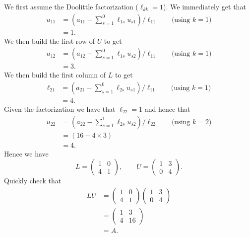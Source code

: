 \documentclass[10pt]{article}
\begin{document}
\begin{enumerate}
  We first assume the Doolittle factorization ($\ell_{kk} = 1$). We
  immediately get that
  \begin{align*}
    u_{11} & = \left( a_{11} - \sum_{s=1}^{0} \ell_{1s} u_{s1} \right) /
    \ell_{11} \qquad \text{(using $k=1$)} \\
    & = 1.
  \end{align*}
  We then build the first row of $U$ to get
  \begin{align*}
    u_{12} & = \left( a_{12} - \sum_{s=1}^{0} \ell_{1s} u_{s2} \right) /
    \ell_{11} \qquad \text{(using $k=1$)} \\
    & = 3.
  \end{align*}
  We then build the first column of $L$ to get
  \begin{align*}
    \ell_{21} & = \left( a_{21} - \sum_{s=1}^{0} \ell_{2s} u_{s1} \right) /
    \ell_{11} \qquad \text{(using $k=1$)} \\
    & = 4.
  \end{align*}
  Given the factorization we have that $\ell_{22} = 1$ and hence that
  \begin{align*}
    u_{22} & = \left( a_{22} - \sum_{s=1}^{1} \ell_{2s} u_{s2} \right) /
    \ell_{22} \qquad \text{(using $k=2$)} \\
    & = (16 - 4 \times 3) \\
    & = 4.
  \end{align*}
  Hence we have
  \begin{equation*}
    L =
    \begin{pmatrix}
      1 & 0 \\ 4 & 1
    \end{pmatrix}, \qquad U =
    \begin{pmatrix}
      1 & 3 \\ 0 & 4
    \end{pmatrix}.
  \end{equation*}
  Quickly check that
  \begin{align*}
    L U & = \begin{pmatrix}
      1 & 0 \\ 4 & 1
    \end{pmatrix} 
    \begin{pmatrix}
      1 & 3 \\ 0 & 4
    \end{pmatrix} \\
    & = \begin{pmatrix}
      1 & 3 \\ 4 & 16
    \end{pmatrix} \\
    & = A.
  \end{align*}


\end{enumerate}
\end{document}
